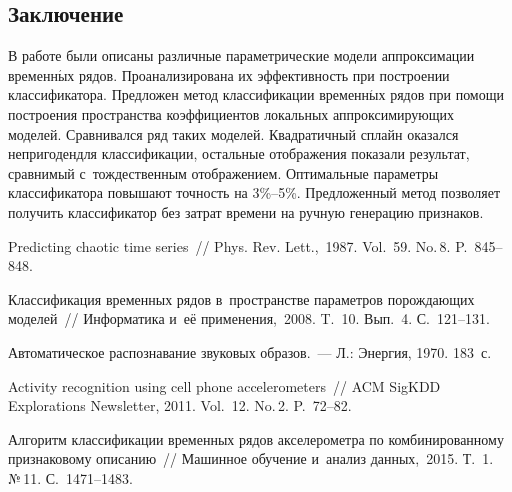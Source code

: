 \begin{multicols}{2}
\section{Заключение}

\vspace*{-1pt}

В работе были описаны различные параметрические модели аппроксимации 
временн$\acute{\mbox{ы}}$х 
рядов. Проанализирована их эффективность при по\-стро\-ении классификатора. 
Предложен метод классификации временн$\acute{\mbox{ы}}$х рядов при помощи по\-стро\-ения 
пространства коэффициентов локальных аппроксимирующих моделей. 
Сравнивался ряд таких моделей.  Квадратичный сплайн оказался 
непригоден\linebreak для классификации, остальные отображения по\-казали результат, 
сравнимый с~тождественным отоб\-ра\-же\-ни\-ем. Оптимальные параметры классификатора 
повышают точность на 3\%--5\%. Предложенный метод позволяет получить 
классификатор без затрат времени на ручную генерацию признаков.
{

}

\vspace*{-9pt}

{\small\frenchspacing
 {%
 \begin{thebibliography}{99}
 
 \vspace*{-1pt}
 
Predicting chaotic time series~// Phys. Rev. Lett.,~1987. Vol.~59. No.\,8. P.~845--848.

Классификация временных рядов в~пространстве параметров порожда\-ющих моделей~// 
Информатика и~её применения,~2008. T.~10. Вып.~4. С.~121--131.



Автоматическое распознавание звуковых образов.~--- Л.: Энергия, 1970.  183~с.

Activity recognition using cell phone accelerometers~// 
ACM SigKDD Explorations Newsletter, 2011. Vol.~12. No.\,2. P.~72--82.

Алгоритм классификации временных рядов акселерометра по комбинированному 
признаковому описанию~// Машинное обучение и~анализ данных,~2015. Т.~1. №\,11. 
С.~1471--1483.


\end{thebibliography}}}
\end{multicols}
